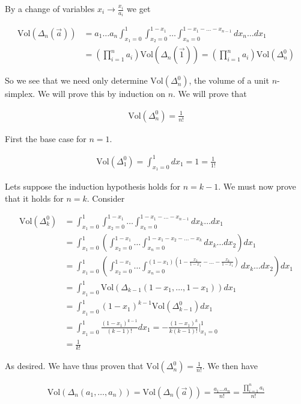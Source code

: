 \documentclass[12pt]{article}
\begin{document}
By a change of variables $x_i \rightarrow \frac{x_i}{a_i}$ we get

\begin{align}
\text{Vol}(\Delta_n(\vec{a})) &= a_1\ldots a_n \int_{x_1=0}^1 \int_{x_2=0}^{1-x_1}\ldots \int_{x_n=0}^{1-x_1-\ldots-x_{n-1}} dx_n\ldots dx_1\\
&= \left(\prod_{i=1}^n a_i\right)\text{Vol}(\Delta_n(\vec{1})) = \left(\prod_{i=1}^n a_i\right) \text{Vol}(\Delta_n^0)
\end{align}

So we see that we need only determine $\text{Vol}(\Delta_n^0)$, the volume of a unit $n$-simplex. We will prove this by induction on $n$. We will prove that

\begin{align}
\text{Vol}(\Delta_n^0) = \frac{1}{n!}
\end{align}

First the base case for $n=1$.

\begin{align}
\text{Vol}(\Delta_1^0) = \int_{x_1=0}^1 dx_1 = 1 = \frac{1}{1!}
\end{align}

Lets suppose the induction hypothesis holds for $n=k-1$. We must now prove that it holds for $n=k$. Consider

\begin{align}
\text{Vol}(\Delta_k^0) &= \int_{x_1=0}^1 \int_{x_2=0}^{1-x_1} \ldots \int_{x_k=0}^{1-x_1-\ldots-x_{n-1}} dx_k\ldots dx_1\\
&= \int_{x_1=0}^1 \left(\int_{x_2=0}^{1-x_1}\ldots\int_{x_n=0}^{1-x_1-x_2-\ldots-x_k}dx_k\ldots dx_2 \right) dx_1\\
&= \int_{x_1=0}^1 \left(\int_{x_2=0}^{1-x_1}\ldots\int_{x_n=0}^{(1-x_1)\left(1-\frac{x_2}{1-x_1} -\ldots- \frac{x_k}{1-x_1}\right)}dx_k\ldots dx_2 \right) dx_1\\
&= \int_{x_1=0}^1 \text{Vol}(\Delta_{k-1}(1-x_1,\ldots,1-x_1))dx_1\\
&= \int_{x_1=0}^1 (1-x_1)^{k-1}\text{Vol}(\Delta_{k-1}^0) dx_1\\
&= \int_{x_1=0}^1 \frac{(1-x_1)^{k-1}}{(k-1)!}dx_1 = -\frac{(1-x_1)^k}{k(k-1)!}\Big\rvert_{x_1=0}^1\\
&= \frac{1}{k!}
\end{align}

As desired. We have thus proven that $\text{Vol}(\Delta_n^0) = \frac{1}{n!}$. We then have

\begin{align}
\text{Vol}(\Delta_n(a_1,\ldots,a_n)) = \text{Vol}(\Delta_n(\vec{a})) = \frac{a_1\ldots a_n}{n!} = \frac{\prod_{i=1}^n a_i}{n!}
\end{align}
\end{document}
